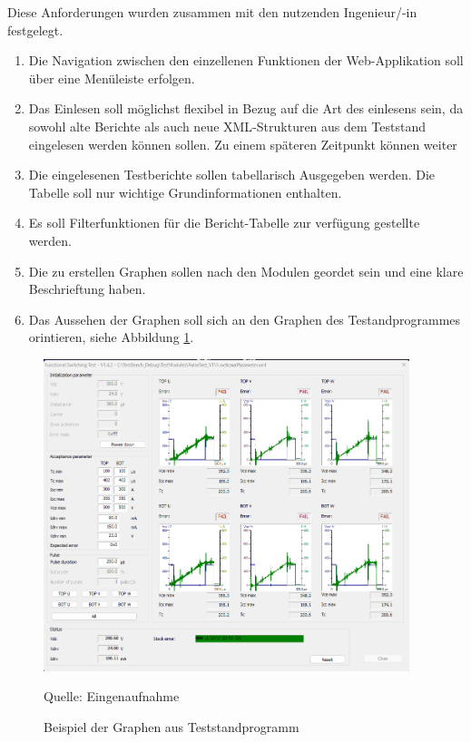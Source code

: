 Diese Anforderungen wurden zusammen mit den nutzenden Ingenieur/-in festgelegt.
\begin{enumerate}ausgearbeitet.

    \item Die Navigation zwischen den einzellenen Funktionen der Web-Applikation soll über eine Menüleiste erfolgen.
    \item Das Einlesen soll möglichst flexibel in Bezug auf die Art des einlesens sein, da sowohl alte Berichte als auch
    neue \ac{XML}-Strukturen aus dem Teststand eingelesen werden können sollen. Zu einem späteren Zeitpunkt können weiter
    \item Die eingelesenen Testberichte sollen tabellarisch Ausgegeben werden. Die Tabelle soll nur wichtige
    Grundinformationen enthalten.
    \item Es soll Filterfunktionen für die Bericht-Tabelle zur verfügung gestellte werden.
    \item Die zu erstellen Graphen sollen nach den Modulen geordet sein und eine klare Beschrieftung haben.
    \item Das Aussehen der Graphen soll sich an den Graphen des Testandprogrammes orintieren, siehe Abbildung \ref{fig: Beispiel der Graphen aus Teststandprogramm}.

\end{enumerate}

\begin{figure}[h]
    \centering
    \includegraphics[width=0.95\textwidth]{Grafiken/Beispiel_Teststandgraphen}
    \caption{Beispiel der Graphen aus Teststandprogramm}
    \label{fig: Beispiel der Graphen aus Teststandprogramm}
    {Quelle: Eingenaufnahme}
\end{figure}

